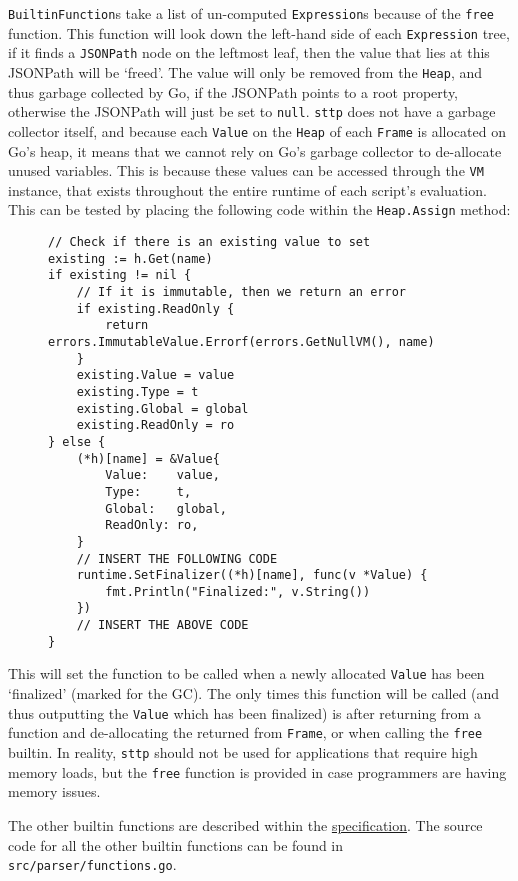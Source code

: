 \verb|BuiltinFunction|s take a list of un-computed \verb|Expression|s because of the \verb|free| function. This function will look down the left-hand side of each \verb|Expression| tree, if it finds a \verb|JSONPath| node on the leftmost leaf, then the value that lies at this JSONPath will be `freed'. The value will only be removed from the \verb|Heap|, and thus garbage collected by Go, if the JSONPath points to a root property, otherwise the JSONPath will just be set to \verb|null|. \verb|sttp| does not have a garbage collector itself, and because each \verb|Value| on the \verb|Heap| of each \verb|Frame| is allocated on Go's heap, it means that we cannot rely on Go's garbage collector to de-allocate unused variables. This is because these values can be accessed through the \verb|VM| instance, that exists throughout the entire runtime of each script's evaluation. This can be tested by placing the following code within the \verb|Heap.Assign| method:

\begin{figure}[H]
    \begin{verbatim}
// Check if there is an existing value to set
existing := h.Get(name)
if existing != nil {
    // If it is immutable, then we return an error
    if existing.ReadOnly {
        return errors.ImmutableValue.Errorf(errors.GetNullVM(), name)
    }
    existing.Value = value
    existing.Type = t
    existing.Global = global
    existing.ReadOnly = ro
} else {
    (*h)[name] = &Value{
        Value:    value,
        Type:     t,
        Global:   global,
        ReadOnly: ro,
    }
    // INSERT THE FOLLOWING CODE
    runtime.SetFinalizer((*h)[name], func(v *Value) {
        fmt.Println("Finalized:", v.String())
    })
    // INSERT THE ABOVE CODE
}
    \end{verbatim}
\end{figure}

This will set the function to be called when a newly allocated \verb|Value| has been `finalized' (marked for the GC). The only times this function will be called (and thus outputting the \verb|Value| which has been finalized) is after returning from a function and de-allocating the returned from \verb|Frame|, or when calling the \verb|free| builtin. In reality, \verb|sttp| should not be used for applications that require high memory loads, but the \verb|free| function is provided in case programmers are having memory issues.

The other builtin functions are described within the \hyperref[sec:builtins]{specification}. The source code for all the other builtin functions can be found in \verb|src/parser/functions.go|.
